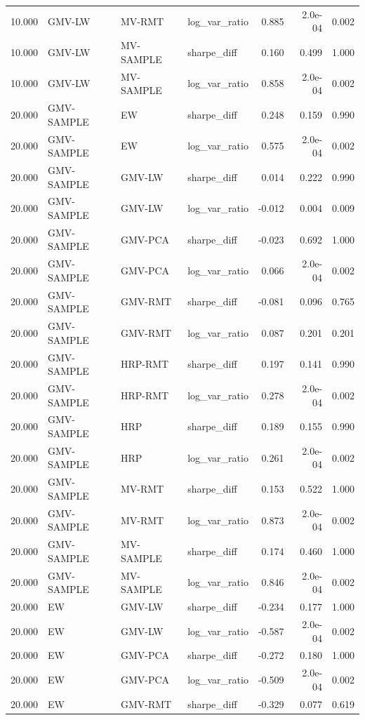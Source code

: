 \begin{table}[t]
{\begin{tabular}{rlllrrr}
10.000 & GMV-LW & MV-RMT & log\_var\_ratio & 0.885 & 2.0e-04 & 0.002 \\
10.000 & GMV-LW & MV-SAMPLE & sharpe\_diff & 0.160 & 0.499 & 1.000 \\
10.000 & GMV-LW & MV-SAMPLE & log\_var\_ratio & 0.858 & 2.0e-04 & 0.002 \\
20.000 & GMV-SAMPLE & EW & sharpe\_diff & 0.248 & 0.159 & 0.990 \\
20.000 & GMV-SAMPLE & EW & log\_var\_ratio & 0.575 & 2.0e-04 & 0.002 \\
20.000 & GMV-SAMPLE & GMV-LW & sharpe\_diff & 0.014 & 0.222 & 0.990 \\
20.000 & GMV-SAMPLE & GMV-LW & log\_var\_ratio & -0.012 & 0.004 & 0.009 \\
20.000 & GMV-SAMPLE & GMV-PCA & sharpe\_diff & -0.023 & 0.692 & 1.000 \\
20.000 & GMV-SAMPLE & GMV-PCA & log\_var\_ratio & 0.066 & 2.0e-04 & 0.002 \\
20.000 & GMV-SAMPLE & GMV-RMT & sharpe\_diff & -0.081 & 0.096 & 0.765 \\
20.000 & GMV-SAMPLE & GMV-RMT & log\_var\_ratio & 0.087 & 0.201 & 0.201 \\
20.000 & GMV-SAMPLE & HRP-RMT & sharpe\_diff & 0.197 & 0.141 & 0.990 \\
20.000 & GMV-SAMPLE & HRP-RMT & log\_var\_ratio & 0.278 & 2.0e-04 & 0.002 \\
20.000 & GMV-SAMPLE & HRP & sharpe\_diff & 0.189 & 0.155 & 0.990 \\
20.000 & GMV-SAMPLE & HRP & log\_var\_ratio & 0.261 & 2.0e-04 & 0.002 \\
20.000 & GMV-SAMPLE & MV-RMT & sharpe\_diff & 0.153 & 0.522 & 1.000 \\
20.000 & GMV-SAMPLE & MV-RMT & log\_var\_ratio & 0.873 & 2.0e-04 & 0.002 \\
20.000 & GMV-SAMPLE & MV-SAMPLE & sharpe\_diff & 0.174 & 0.460 & 1.000 \\
20.000 & GMV-SAMPLE & MV-SAMPLE & log\_var\_ratio & 0.846 & 2.0e-04 & 0.002 \\
20.000 & EW & GMV-LW & sharpe\_diff & -0.234 & 0.177 & 1.000 \\
20.000 & EW & GMV-LW & log\_var\_ratio & -0.587 & 2.0e-04 & 0.002 \\
20.000 & EW & GMV-PCA & sharpe\_diff & -0.272 & 0.180 & 1.000 \\
20.000 & EW & GMV-PCA & log\_var\_ratio & -0.509 & 2.0e-04 & 0.002 \\
20.000 & EW & GMV-RMT & sharpe\_diff & -0.329 & 0.077 & 0.619 \\

\end{tabular}}
\end{table}

